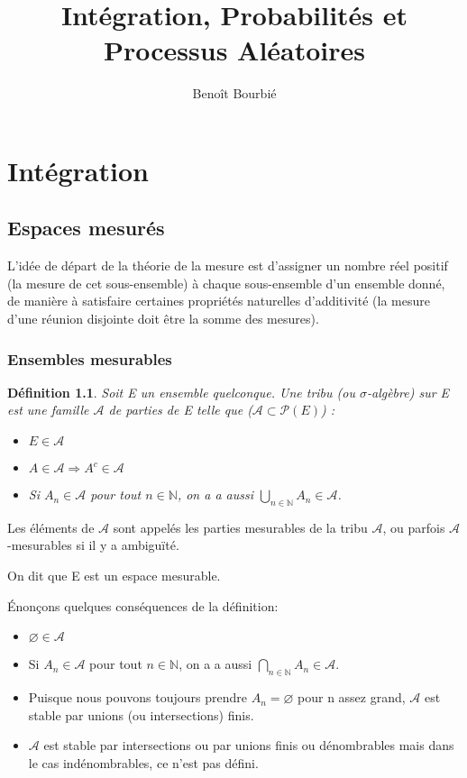 \documentclass[a4paper,twoside,11pt]{book}
\title{Intégration, Probabilités et Processus Aléatoires}
\author{Benoît Bourbié}
\newtheorem{definition}{Définition}[section]
\begin{document}
\maketitle

\part{Intégration}

\chapter{Espaces mesurés}

L'idée de départ de la théorie de la mesure est d'assigner un nombre réel positif (la mesure de cet sous-ensemble) à  chaque sous-ensemble d'un ensemble donné, de manière à satisfaire certaines propriétés naturelles d'additivité (la mesure d'une réunion disjointe doit être la somme des mesures).

\section{Ensembles mesurables}

\begin{definition}
Soit E un ensemble quelconque. Une tribu (ou $\sigma$-algèbre) sur E est une
famille $\mathcal{A}$ de parties de E telle que ($ \mathcal{A} \subset \mathcal{P}(E)$) :
\begin{itemize}
\item $E \in \mathcal{A}$
\item $A \in \mathcal{A} \Rightarrow A^{c} \in \mathcal{A}$
\item Si $A_{n} \in  \mathcal{A} $ pour tout $n \in \mathbb{N}$, on a a aussi $\bigcup\limits_{n \in \mathbb{N}} A_{n}  \in \mathcal{A}$.
\end{itemize}
\end{definition}

Les éléments de $\mathcal{A}$ sont appelés les parties mesurables de la tribu
$\mathcal{A}$, ou parfois $\mathcal{A}$-mesurables si il y a ambiguïté.


On dit que E est un espace mesurable.


Énonçons quelques conséquences de la définition:


\begin{itemize}
\item $\varnothing \in  \mathcal{A}$
\item Si $A_{n} \in  \mathcal{A} $ pour tout $n \in \mathbb{N}$, on a a aussi $\bigcap\limits_{n \in \mathbb{N}} A_{n}  \in \mathcal{A}$.
\item Puisque nous pouvons toujours prendre $A_n = \varnothing$ pour n assez grand, $\mathcal{A}$ est stable par unions (ou intersections) finis.
\item $\mathcal{A}$  est stable par intersections ou par unions finis ou dénombrables mais dans le cas indénombrables, ce n'est pas défini.
\end{itemize}
\end{document}
